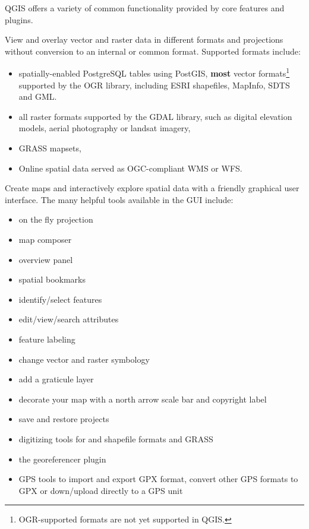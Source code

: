 QGIS offers a variety of common functionality provided by core features and
plugins.


View and overlay vector and raster data in different formats and
projections without conversion to an internal or common format. Supported
formats include:

\begin{itemize}
\item spatially-enabled PostgreSQL tables using PostGIS, \textbf{most} vector
formats\footnote{OGR-supported formats are not yet supported in QGIS.}
supported by the OGR library, including ESRI shapefiles, MapInfo,
SDTS and GML.
\item all raster formats supported by the GDAL library, such as digital
elevation models, aerial photography or landsat imagery,
\item GRASS mapsets, 
\item Online spatial data served as OGC-compliant WMS or WFS.
\end{itemize}


Create maps and interactively explore spatial data with a friendly graphical
user interface. The many helpful tools available in the GUI include:

\begin{itemize}
\item on the fly projection
\item map composer
\item overview panel
\item spatial bookmarks
\item identify/select features
\item edit/view/search attributes
\item feature labeling
\item change vector and raster symbology
\item add a graticule layer
\item decorate your map with a north arrow scale bar and copyright label
\item save and restore projects
\end{itemize}


\begin{itemize}
\item digitizing tools for and shapefile formats and GRASS
\item the georeferencer plugin
\item GPS tools to import and export GPX format, convert other GPS formats to
GPX or down/upload directly to a GPS unit
\end{itemize}

